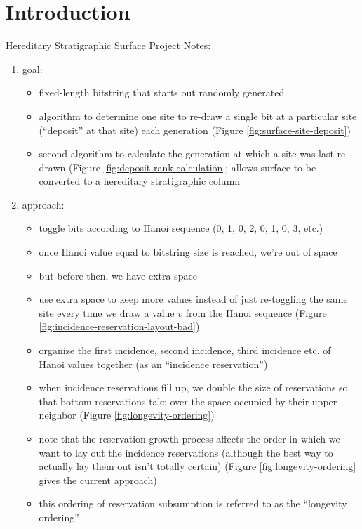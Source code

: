 \section{Introduction} \label{sec:introduction}

Hereditary Stratigraphic Surface Project Notes:

\begin{enumerate}
\item goal:
\begin{itemize}
  \item fixed-length bitstring that starts out randomly generated
  \item algorithm to determine one site to re-draw a single bit at a particular site (``deposit'' at that site) each generation (Figure \ref{fig:surface-site-deposit})
  \item second algorithm to calculate the generation at which a site was last re-drawn (Figure \ref{fig:deposit-rank-calculation}; allows surface to be converted to a hereditary stratigraphic column
\end{itemize}
\item approach:
\begin{itemize}
  \item toggle bits according to Hanoi sequence (0, 1, 0, 2, 0, 1, 0, 3, etc.)
  \item once Hanoi value equal to bitstring size is reached, we're out of space
  \item but before then, we have extra space
  \item use extra space to keep more values instead of just re-toggling the same site every time we draw a value $v$ from the Hanoi sequence (Figure \ref{fig:incidence-reservation-layout-bad})
  \item organize the first incidence, second incidence, third incidence etc. of Hanoi values together (as an ``incidence reservation'')
  \item when incidence reservations fill up, we double the size of reservations so that bottom reservations take over the space occupied by their upper neighbor (Figure \ref{fig:longevity-ordering})
  \item note that the reservation growth process affects the order in which we want to lay out the incidence reservations (although the best way to actually lay them out isn't totally certain) (Figure \ref{fig:longevity-ordering} gives the current approach)
  \item this ordering of reservation subsumption is referred to as the ``longevity ordering''

\end{itemize}
\end{enumerate}
